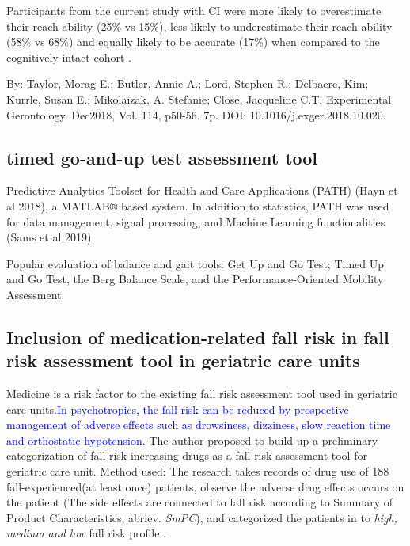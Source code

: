 \documentclass{article}
\begin{document}
Participants from the current study with CI were more likely to overestimate their reach ability (25\% vs 15\%), less likely to underestimate their reach ability (58\% vs 68\%) and equally likely to be accurate (17\%) 
when compared to the cognitively intact cohort \cite{Taylor_2018}.

By: Taylor, Morag E.; Butler, Annie A.; Lord, Stephen R.; Delbaere, Kim; Kurrle, Susan E.; Mikolaizak, A. Stefanie; Close, Jacqueline C.T. Experimental Gerontology. Dec2018, Vol. 114, p50-56. 7p. DOI: 10.1016/j.exger.2018.10.020.

\subsection{timed go-and-up test assessment tool}

Predictive Analytics Toolset for Health and Care Applications (PATH) (Hayn et al 2018), a MATLAB® based system. In addition to statistics, PATH was used for data management, signal processing, and Machine Learning functionalities (Sams et al 2019). \cite{Ziegl_2020}

Popular evaluation of balance and gait tools:
Get Up and Go Test; Timed Up and Go Test, the Berg Balance Scale, and the Performance‐Oriented Mobility Assessment\cite{PreventionofFalls2011}.


\subsection{Inclusion of medication-related fall risk in fall risk assessment tool in geriatric care units}
Medicine is a risk factor to the existing fall risk assessment tool used in geriatric care units.\textcolor{blue}{In psychotropics, the fall risk can be reduced by prospective management of adverse effects such as drowsiness, dizziness, slow reaction time and orthostatic hypotension.} The author proposed to build up a preliminary categorization of fall-risk increasing drugs as a fall risk assessment tool for geriatric care unit. Method used: The research takes records of drug use of 188 fall-experienced(at least once) patients, observe the adverse drug effects occurs on the patient (The side effects are connected to fall risk according to Summary of Product Characteristics, abriev. \emph{SmPC}), and categorized the patients in to \emph{high, medium and low} fall risk profile .
\end{document}
